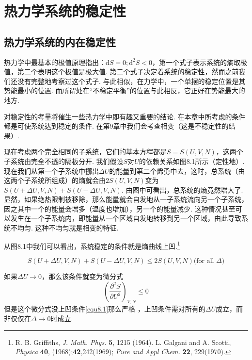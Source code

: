 

\chapter{热力学系统的稳定性}
\label{chap8}
\section{热力学系统的内在稳定性}
\label{sec3.1}
热力学中最基本的极值原理指出：$\text{d}S=0; \text{d}^2S<0$，第一个式子表示系统的熵取极值，第二个表明这个极值是极大值. 第二个式子决定着系统的稳定性，然而之前我们还没有完整地考察过这个式子. 与此相似，在力学中，一个单摆的稳定位置是其势能最小的位置. 而所谓处在“不稳定平衡”的位置与此相反，它正好在势能最大的地方.

对稳定性的考量将催生一些热力学中即有趣又重要的结论. 在本章中所考虑的条件都是可使系统达到稳定的条件. 在第9章中我们会考查相变（这是不稳定性的结果）.

现在考虑两个完全相同的子系统，它们的基本方程都是$S=S(U,V,N)$，这两个子系统由完全不透的隔板分开. 我们假设$S$对$U$的依赖关系如图8.1所示（定性地）. 现在我们从第一个子系统中挪出$\Delta U$的能量到第二个烯勇中去，这时，总系统（由这两个子系统所组成）的熵就会由$2S(U,V,N)$变为$S(U+\Delta　U,V,N)+S(U-\Delta U,V,N)$. 由图中可看出，总系统的熵竟然增大了. 显然，如果绝热限制被移除，那么能量就会自发地从一子系统流向另一个子系统，因之其中一个的能量会增多（温度也增加），另一个的能量减少. 这种情况甚至可以发生在一个子系统内，即能量从一个区域自发地转移到另一个区域，由此导致系统不均匀. 这种不均匀就是相变的特征.

从图8.1中我们可以看出，系统稳定的条件就是熵曲线上凹.\footnote{R. B. Griffiths, \textit{J. Math. Phys.} \textbf{5}, 1215 (1964). L. Galgani and A. Scotti, \textit{Physica} \textbf{40}, (1968);\textbf{42},242(1969); \textit{Pure and Appl Chem.} \textbf{22}, 229(1970).}

\begin{equation}
\label{equ8.1}
S(U+\Delta　U,V,N)+S(U-\Delta U,V,N)\leq 2S(U,V,N) \text{(for all $\Delta$)}
\end{equation}

如果$\Delta U\to 0$，那么该条件就变为微分式
\begin{equation}
\label{equ8.2}
\left(\frac{\partial^2S}{\partial U^2}\right)_{V,N}\leq 0
\end{equation}
但是这个微分式没上凹条件\ref{equ8.1}那么严格
，上凹条件需对所有的$\Delta U$成立，而非仅仅在$\Delta\to 0$时成立.

